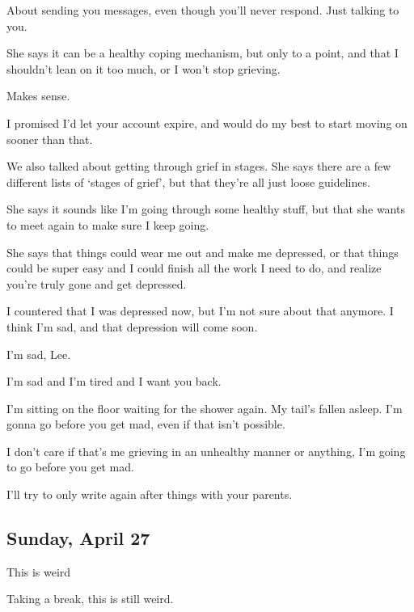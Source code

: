 {
About sending you messages, even
though you'll never respond. Just talking to you.

She says it can be a healthy coping
mechanism, but only to a point, and that I shouldn't lean on it too
much, or I won't stop grieving.

Makes sense.

I promised I'd let your account
expire, and would do my best to start moving on sooner than that.

We also talked about getting through
grief in stages. She says there are a few different lists of `stages of
grief', but that they're all just loose guidelines.

She says it sounds like I'm going
through some healthy stuff, but that she wants to meet again to make
sure I keep going.

She says that things could wear me
out and make me depressed, or that things could be super easy and I
could finish all the work I need to do, and realize you're truly gone
and get depressed.

I countered that I was depressed
now, but I'm not sure about that anymore. I think I'm sad, and that
depression will come soon.

I'm sad, Lee.

I'm sad and I'm tired and I want you
back.

I'm sitting on the floor waiting for
the shower again. My tail's fallen asleep. I'm gonna go before you get
mad, even if that isn't possible.

I don't care if that's me grieving
in an unhealthy manner or anything, I'm going to go before you get mad.

I'll try to only write again after
things with your parents.

\newpage

\subsection*{Sunday, April 27}\label{sunday-april-27}

This is weird

Taking a break, this is still weird.

}
